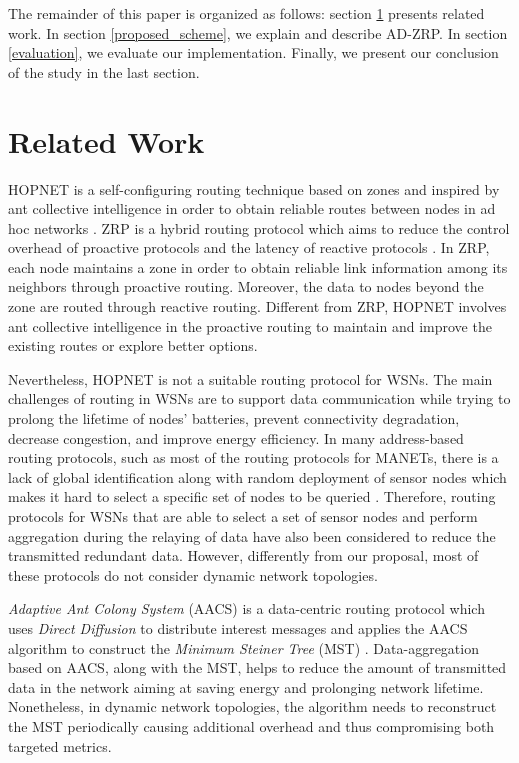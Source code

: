 \documentclass[conference]{IEEEtran}
\begin{document}
The remainder of this paper is organized as follows: section \ref{related} presents related work.
In section \ref{proposed_scheme}, we explain and describe AD-ZRP.
In section \ref{evaluation}, we evaluate our implementation.
Finally, we present our conclusion of the study in the last section.

\section{Related Work}
\label{related}
\IEEEpubidadjcol

HOPNET is a self-configuring routing technique based on zones and inspired by ant collective intelligence in order to obtain reliable routes between nodes in ad hoc networks \cite{Wang:2009}.
ZRP is a hybrid routing protocol which aims to reduce the control overhead of proactive protocols and the latency of reactive protocols \cite{Haas:1997}.
In ZRP, each node maintains a zone in order to obtain reliable link information among its neighbors through proactive routing.
Moreover, the data to nodes beyond the zone are routed through reactive routing.
Different from ZRP, HOPNET involves ant collective intelligence in the proactive routing to maintain and improve the existing routes or explore better options.

Nevertheless, HOPNET is not a suitable routing protocol for WSNs.
The main challenges of routing in WSNs are to support data communication while trying to prolong the lifetime of nodes' batteries, prevent connectivity degradation, decrease congestion, and improve energy efficiency.
In many address-based routing protocols, such as most of the routing protocols for MANETs, there is a lack of global identification along with random deployment of sensor nodes which makes it hard to select a specific set of nodes to be queried \cite{Akkaya:2005}.
Therefore, routing protocols for WSNs that are able to select a set of sensor nodes and perform aggregation during the relaying of data have also been considered to reduce the transmitted redundant data.
However, differently from our proposal, most of these protocols do not consider dynamic network topologies.

\emph{Adaptive Ant Colony System} (AACS) is a data-centric routing protocol which uses \emph{Direct Diffusion} to distribute interest messages and applies the AACS algorithm to construct the \emph{Minimum Steiner Tree} (MST) \cite{Li:2008}.
Data-aggregation based on AACS, along with the MST, helps to reduce the amount of transmitted data in the network aiming at saving energy and prolonging network lifetime.
Nonetheless, in dynamic network topologies, the algorithm needs to reconstruct the MST periodically causing additional overhead and thus compromising both targeted metrics.
\end{document}
